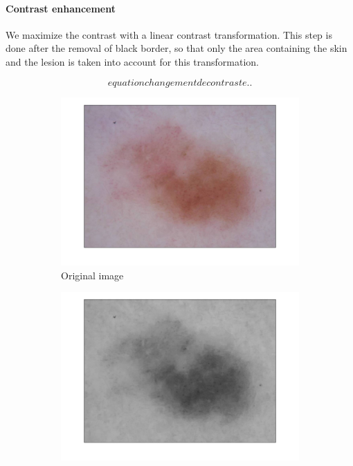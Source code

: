 \documentclass[a4paper,10pt]{article}
\begin{document}
\paragraph{Contrast enhancement}
We maximize the contrast with a linear contrast transformation. This step is done after the removal of black border, so that only the area containing the skin and the lesion is taken into account for this transformation.

$$
equation changement de contraste..
$$

\begin{figure}
\begin{subfigure}{0.32\linewidth}			
	\includegraphics[width=0.99\linewidth]{../results/color-channel-influence/orig.png}	  
	\caption{Original image}
	\label{fig:grayscale-orig}
\end{subfigure}
\begin{subfigure}{0.32\linewidth}			
	\includegraphics[width=0.99\linewidth]{../results/color-channel-influence/no_dyn_range.png}	  

\end{subfigure}
\end{figure}
\end{document}
